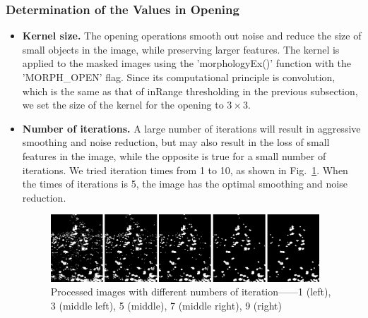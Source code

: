 \subsubsection{Determination of the Values in Opening}
\begin{itemize}
    \item \textbf{Kernel size.} The opening operations smooth out noise and reduce the size of small objects in the image, while preserving larger features. The kernel is applied to the masked images using the 'morphologyEx()' function with the 'MORPH\_OPEN' flag. Since its computational principle is convolution, which is the same as that of inRange thresholding in the previous subsection, we set the size of the kernel for the opening to $3\times 3$.
    
    \item \textbf{Number of iterations.} A large number of iterations will result in aggressive smoothing and noise reduction, but may also result in the loss of small features in the image, while the opposite is true for a small number of iterations. We tried iteration times from 1 to 10, as shown in Fig.~\ref{fig:diff_iteration_times}. When the times of iterations is 5, the image has the optimal smoothing and noise reduction.
    
        \begin{figure}[htb]
                \centering
                \includegraphics[width=0.95\textwidth]{images/iteration.png}
                \caption{Processed images with different numbers of iteration——1 (left), 3 (middle left), 5 (middle), 7 (middle right), 9 (right)}
                \label{fig:diff_iteration_times}
        \end{figure}
    
\end{itemize}



